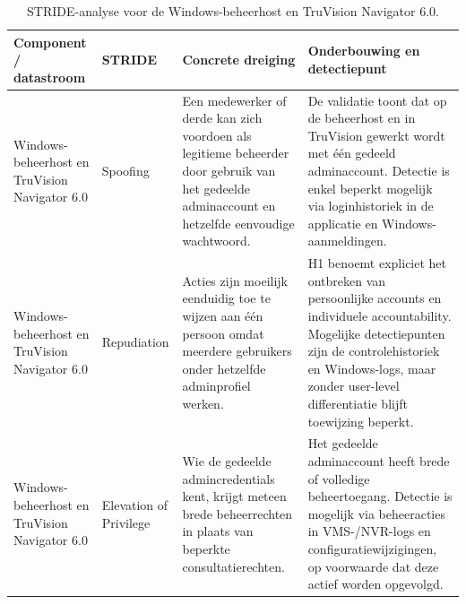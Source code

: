 \begin{table}[H]
    \centering
    \scriptsize
    \caption[STRIDE-analyse voor identiteit en toegangsbeheer]{STRIDE-analyse voor de Windows-beheerhost en TruVision Navigator 6.0.}
    \label{tab:app-stride-identiteit}
    \begin{tabularx}{\textwidth}{p{}p{}X X}
        \hline
        \textbf{Component / datastroom} & \textbf{STRIDE} & \textbf{Concrete dreiging} & \textbf{Onderbouwing en detectiepunt} \\
        \hline
        Windows-beheerhost en TruVision Navigator 6.0 &
        Spoofing &
        Een medewerker of derde kan zich voordoen als legitieme beheerder door gebruik van het gedeelde adminaccount en hetzelfde eenvoudige wachtwoord. &
        De validatie toont dat op de beheerhost en in TruVision gewerkt wordt met één gedeeld adminaccount. Detectie is enkel beperkt mogelijk via loginhistoriek in de applicatie en Windows-aanmeldingen. \\
        \hline
        Windows-beheerhost en TruVision Navigator 6.0 &
        Repudiation &
        Acties zijn moeilijk eenduidig toe te wijzen aan één persoon omdat meerdere gebruikers onder hetzelfde adminprofiel werken. &
        H1 benoemt expliciet het ontbreken van persoonlijke accounts en individuele accountability. Mogelijke detectiepunten zijn de controlehistoriek en Windows-logs, maar zonder user-level differentiatie blijft toewijzing beperkt. \\
        \hline
        Windows-beheerhost en TruVision Navigator 6.0 &
        Elevation of Privilege &
        Wie de gedeelde admincredentials kent, krijgt meteen brede beheerrechten in plaats van beperkte consultatierechten. &
        Het gedeelde adminaccount heeft brede of volledige beheertoegang. Detectie is mogelijk via beheeracties in VMS-/NVR-logs en configuratiewijzigingen, op voorwaarde dat deze actief worden opgevolgd. \\
        \hline
    \end{tabularx}
\end{table}

\subsection{}%
\label{app:stride-beheerinterfaces}

